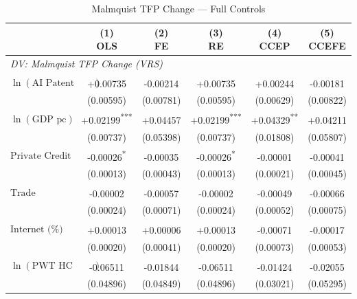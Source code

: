 \begin{table}[htbp]
\centering
\small
\caption{Malmquist TFP Change --- Full Controls}
\label{tab:tab_malmquist_full}
\begin{tabular}{lccccc}
\toprule
 & \makecell{(1)\\OLS} & \makecell{(2)\\FE} & \makecell{(3)\\RE} & \makecell{(4)\\CCEP} & \makecell{(5)\\CCEFE} \\
\midrule
\multicolumn{6}{l}{\textit{DV: Malmquist TFP Change (VRS)}} \\[4pt]
$\ln(\text{AI Patent Stock pc})$ & +0.00735\textsuperscript{} & -0.00214\textsuperscript{} & +0.00735\textsuperscript{} & +0.00244\textsuperscript{} & -0.00181\textsuperscript{} \\
 & (0.00595) & (0.00781) & (0.00595) & (0.00629) & (0.00822) \\[2pt]
$\ln(\text{GDP pc})$ & +0.02199\textsuperscript{***} & +0.04457\textsuperscript{} & +0.02199\textsuperscript{***} & +0.04329\textsuperscript{**} & +0.04211\textsuperscript{} \\
 & (0.00737) & (0.05398) & (0.00737) & (0.01808) & (0.05807) \\[2pt]
$\text{Private Credit}$ & -0.00026\textsuperscript{*} & -0.00035\textsuperscript{} & -0.00026\textsuperscript{*} & -0.00001\textsuperscript{} & -0.00041\textsuperscript{} \\
 & (0.00013) & (0.00043) & (0.00013) & (0.00021) & (0.00045) \\[2pt]
$\text{Trade Openness}$ & -0.00002\textsuperscript{} & -0.00057\textsuperscript{} & -0.00002\textsuperscript{} & -0.00049\textsuperscript{} & -0.00066\textsuperscript{} \\
 & (0.00024) & (0.00071) & (0.00024) & (0.00052) & (0.00075) \\[2pt]
$\text{Internet (\%)}$ & +0.00013\textsuperscript{} & +0.00006\textsuperscript{} & +0.00013\textsuperscript{} & -0.00071\textsuperscript{} & -0.00017\textsuperscript{} \\
 & (0.00020) & (0.00041) & (0.00020) & (0.00073) & (0.00053) \\[2pt]
$\ln(\text{PWT HC Index})$ & -0.06511\textsuperscript{} & -0.01844\textsuperscript{} & -0.06511\textsuperscript{} & -0.01424\textsuperscript{} & -0.02055\textsuperscript{} \\
 & (0.04896) & (0.04849) & (0.04896) & (0.03021) & (0.05295) \\[2pt]

\end{tabular}
\end{table}
